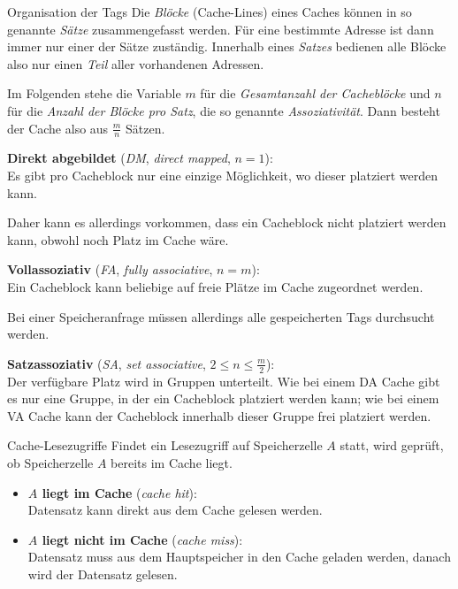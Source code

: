 \begin{defi}{Organisation der Tags}
    Die \emph{Blöcke} (Cache-Lines) eines Caches können in so genannte \emph{Sätze} zusammengefasst werden.
    Für eine bestimmte Adresse ist dann immer nur einer der Sätze zuständig.
    Innerhalb eines \emph{Satzes} bedienen alle Blöcke also nur einen \emph{Teil} aller vorhandenen Adressen.

    Im Folgenden stehe die Variable $m$ für die \emph{Gesamtanzahl der Cacheblöcke} und $n$ für die \emph{Anzahl der Blöcke pro Satz}, die so genannte \emph{Assoziativität}.
    Dann besteht der Cache also aus $\frac {m}{n}$ Sätzen.

    \textbf{Direkt abgebildet} (\emph{DM}, \emph{direct mapped}, $n=1$):\\
    Es gibt pro Cacheblock nur eine einzige Möglichkeit, wo dieser
    platziert werden kann.

    Daher kann es allerdings vorkommen, dass ein Cacheblock
    nicht platziert werden kann, obwohl noch Platz im Cache wäre.

    \textbf{Vollassoziativ} (\emph{FA}, \emph{fully associative}, $n=m$):\\
    Ein Cacheblock kann beliebige auf freie Plätze im Cache zugeordnet
    werden.

    Bei einer Speicheranfrage müssen allerdings alle gespeicherten
    Tags durchsucht werden.

    \textbf{Satzassoziativ} (\emph{SA}, \emph{set associative}, $2\leq n \leq \frac{m}{2}$):\\
    Der verfügbare Platz wird in Gruppen unterteilt. Wie bei einem
    DA Cache gibt es nur eine Gruppe, in der ein Cacheblock platziert werden kann;
    wie bei einem VA Cache kann der Cacheblock innerhalb dieser Gruppe frei platziert
    werden.
\end{defi}

\begin{defi}{Cache-Lesezugriffe}
    Findet ein Lesezugriff auf Speicherzelle $A$ statt, wird geprüft, ob Speicherzelle $A$ bereits im Cache liegt.
    \begin{itemize}
        \item \textbf{$A$ liegt im Cache} (\emph{cache hit}):\\
              Datensatz kann direkt aus dem Cache gelesen werden.
        \item \textbf{$A$ liegt nicht im Cache} (\emph{cache miss}):\\
              Datensatz muss aus dem Hauptspeicher in den Cache geladen werden, danach wird der Datensatz gelesen.
    \end{itemize}
\end{defi}

